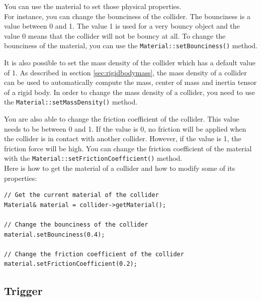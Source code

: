 \documentclass[a4paper,12pt]{article}
\begin{document}
    You can use the material to set those physical properties. \\

    For instance, you can change the bounciness of the collider. The bounciness is a value between 0 and 1. The value 1 is used for
    a very bouncy object and the value 0 means that the collider will not be bouncy at all. To change the bounciness of the material,
    you can use the \texttt{Material::\allowbreak setBounciness()} method. \\

    \begin{sloppypar}
    It is also possible to set the mass density of the collider which has a default value of 1. As described in section \ref{sec:rigidbodymass}, the
    mass density of a collider can be used to automatically compute the mass, center of mass and inertia tensor of a rigid body. In order to change the
    mass density of a collider, you need to use the \texttt{Material::setMassDensity()} method. \\
    \end{sloppypar}

    You are also able to change the friction coefficient of the collider. This value needs to be between 0 and 1. If the value is 0,
    no friction will be applied when the collider is in contact with another collider. However, if the value is 1, the friction force will be high. You can
    change the friction coefficient of the material with the \texttt{Material::\allowbreak setFrictionCoefficient()} method. \\

    Here is how to get the material of a collider and how to modify some of its properties: \\

    \begin{lstlisting}
// Get the current material of the collider
Material& material = collider->getMaterial();

// Change the bounciness of the collider
material.setBounciness(0.4);

// Change the friction coefficient of the collider
material.setFrictionCoefficient(0.2);
  \end{lstlisting}

    \subsection{Trigger}
    \label{sec:trigger}
\end{document}
